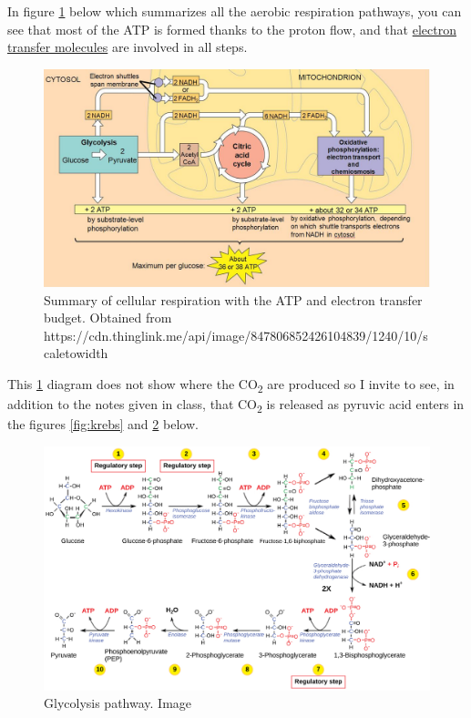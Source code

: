 \documentclass[]{book}
\theoremstyle{definition}
\theoremstyle{definition}
\theoremstyle{definition}
\theoremstyle{remark}
\begin{document}
In figure \ref{fig:respirationglobal} below which summarizes all the
aerobic respiration pathways, you can see that most of the ATP is formed
thanks to the proton flow, and that
\protect\hyperlink{electron-transfer-molecules-that-power-the-proton-pumps}{electron
transfer molecules} are involved in all steps.

\begin{figure}

{\centering \includegraphics[width=0.95\linewidth]{pictures/respiration_global} 

}

\caption{Summary of cellular respiration with the ATP and electron transfer budget. Obtained from https://cdn.thinglink.me/api/image/847806852426104839/1240/10/scaletowidth}\label{fig:respirationglobal}
\end{figure}

This \ref{fig:respirationglobal} diagram does not show where the
CO\textsubscript{2} are produced so I invite to see, in addition to the
notes given in class, that CO\textsubscript{2} is released as pyruvic
acid enters in the figures \ref{fig:krebs} and \ref{fig:glycolysis}
below.

\begin{figure}

{\centering \includegraphics[width=0.95\linewidth]{pictures/Glycolysis} 

}

\caption{Glycolysis pathway. Image}\label{fig:glycolysis}
\end{figure}
\end{document}
